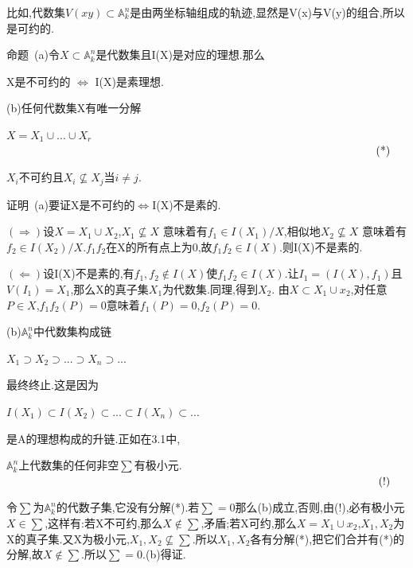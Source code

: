 \documentclass[UTF8]{book}
\begin{document}
		
		比如,代数集$V(xy)\subset \mathbb{A}^{n}_{k}$是由两坐标轴组成的轨迹,显然是V(x)与V(y)的组合,所以是可约的.
		
		
		$\textbf{命题}$\ (a)令$X\subset \mathbb{A}^{n}_{k}$是代数集且I(X)是对应的理想.那么
		
		
		\begin{center}
			X是不可约的 $\iff$ I(X)是素理想.
		\end{center}
		
		
		(b)任何代数集X有唯一分解
		
		
		\begin{center}
			$X=X_{1}\cup...\cup X_{r}$ $\rightline{(*)}$
		\end{center}
		
		
		$X_{i}$不可约且$X_{i}\nsubseteq X_{j}$当$i\ne j$.
		
		
		$\text{证明}$\ (a)要证X是不可约的$\iff$I(X)不是素的.
		
		
		$(\Rightarrow)$设$X=X_{1} \cup X_{2}$,$X_{1}\nsubseteq X$ 意味着有$f_{1}\in I(X_{1})/X$,相似地$X_{2}\nsubseteq X$ 意味着有$f_{2}\in I(X_{2})/X$.$f_{1}f_{2}$在X的所有点上为0,故$f_{1}f_{2}\in I(X)$.则I(X)不是素的.
		
		
		$(\Leftarrow)$设I(X)不是素的,有$f_{1},f_{2}\notin I(X)$使$f_{1}f_{2}\in I(X)$.让$I_{1}=(I(X),f_{1})$且$V(I_{1})=X_{1}$,那么X的真子集$X_{1}$为代数集.同理,得到$X_{2}$. 由$X\subset X_{1}\cup x_{2}$,对任意$P\in X$,$f_{1}f_{2}(P)=0$意味着$f_{1}(P)=0$,$f_{2}(P)=0$.
		
		
		(b)$\mathbb{A}^{n}_{k}$中代数集构成链
		
		
		\begin{center}
			$X_{1}\supset X_{2}\supset ... \supset X_{n} \supset...$
		\end{center}
		
		
		最终终止.这是因为
		
		
		\begin{center}
			$I(X_{1})\subset I(X_{2})\subset ... \subset I(X_{n}) \subset...$
		\end{center}
		
		
		是A的理想构成的升链.正如在3.1中,
		
		
		\begin{center}
			$\mathbb{A}^{n}_{k}$上代数集的任何非空$\sum$有极小元.$\rightline{(!)}$
		\end{center}
		
		
		令$\sum$为$\mathbb{A}^{n}_{k}$的代数子集,它没有分解(*).若$\sum=0$那么(b)成立,否则,由(!),必有极小元$X\in \sum$,这样有:若X不可约,那么$X\notin \sum$,矛盾;若X可约,那么$X= X_{1}\cup x_{2}$,$X_{1},X_{2}$为X的真子集.又X为极小元,$X_{1},X_{2}\nsubseteq \sum$.所以$X_{1},X_{2}$各有分解(*),把它们合并有(*)的分解,故$X\notin \sum$.所以$\sum =0$.(b)得证.
\end{document}
